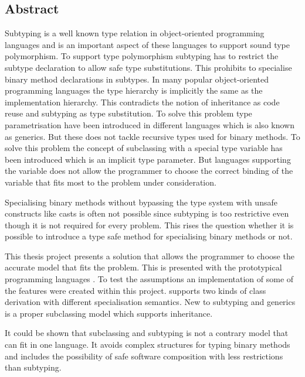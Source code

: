 %
%
\subsection*{Abstract}
Subtyping is a well known type relation in object-oriented
programming languages and is an important aspect of these languages
to support sound type polymorphism. To support type polymorphism
subtyping has to restrict the subtype declaration to allow safe type
substitutions. This prohibits to specialise binary method declarations in
subtypes. In many popular object-oriented programming languages the type
hierarchy is implicitly the same as the implementation hierarchy. This
contradicts the notion of inheritance as code reuse and subtyping as type
substitution. To solve this problem type parametrisation have been introduced in
different languages which is also known as generics. But these does not
tackle recursive types used for binary methods. To solve this problem
the concept of subclassing with a special type variable \mytype has been
introduced which is an implicit type parameter. But languages supporting
the \mytype variable does not allow the programmer to choose the correct
binding of the variable that fits most to the problem under consideration.

Specialising binary methods without bypassing the type system with
unsafe constructs like casts is often not possible since subtyping is
too restrictive even though it is not required for every problem. This
rises the question whether it is possible to introduce a type safe method
for specialising binary methods or not.

This thesis project presents a solution that allows the programmer to
choose the accurate model that fits the problem. This is presented
with the prototypical programming languages \ooplss. To test the
assumptions an implementation of some of the features were created
within this project. \ooplss supports two kinds of class derivation
with different specialisation semantics. New to subtyping and generics
is a proper subclassing model which supports inheritance.

It could be shown that subclassing and subtyping is not a contrary model
that can fit in one language. It avoids complex structures for typing
binary methods and includes the possibility of safe software composition
with less restrictions than subtyping.



%
